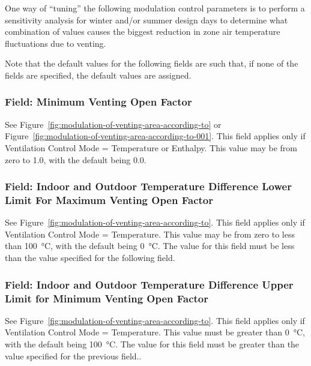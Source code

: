 One way of ``tuning'' the following modulation control parameters is to perform a sensitivity analysis for winter and/or summer design days to determine what combination of values causes the biggest reduction in zone air temperature fluctuations due to venting.

Note that the default values for the following fields are such that, if none of the fields are specified, the default values are assigned.

\subsubsection{Field: Minimum Venting Open Factor}\label{field-minimum-venting-open-factor}

See Figure~\ref{fig:modulation-of-venting-area-according-to} or Figure~\ref{fig:modulation-of-venting-area-according-to-001}. This field applies only if Ventilation Control Mode = Temperature or Enthalpy. This value may be from zero to 1.0, with the default being 0.0.

\subsubsection{Field: Indoor and Outdoor Temperature Difference Lower Limit For Maximum Venting Open Factor}\label{field-indoor-and-outdoor-temperature-difference-lower-limit-for-maximum-venting-open-factor}

See Figure~\ref{fig:modulation-of-venting-area-according-to}. This field applies only if Ventilation Control Mode = Temperature. This value may be from zero to less than \SI{100}{\celsius}, with the default being \SI{0}{\celsius}. The value for this field must be less than the value specified for the following field.

\subsubsection{Field: Indoor and Outdoor Temperature Difference Upper Limit for Minimum Venting Open Factor}\label{field-indoor-and-outdoor-temperature-difference-upper-limit-for-minimum-venting-open-factor}

See Figure~\ref{fig:modulation-of-venting-area-according-to}. This field applies only if Ventilation Control Mode = Temperature. This value must be greater than \SI{0}{\celsius}, with the default being \SI{100}{\celsius}. The value for this field must be greater than the value specified for the previous field..

